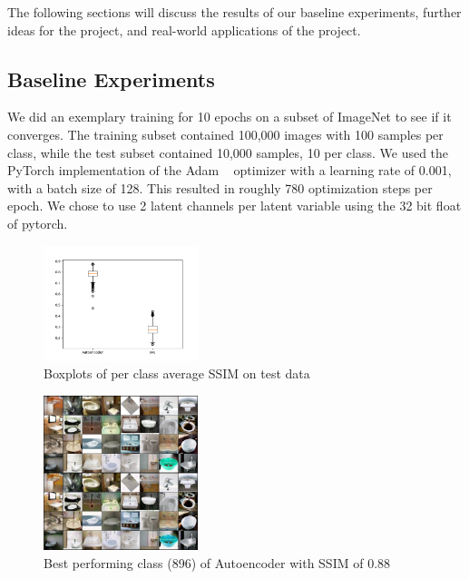 The following sections will discuss the results of our baseline experiments, further ideas for the project, and real-world applications of the project.

\subsection{Baseline Experiments}\label{subsec:baseline-results}
We did an exemplary training for 10 epochs on a subset of ImageNet to see if it converges.
The training subset contained 100,000 images with 100 samples per class, while the test subset contained 10,000 samples, 10 per class.
We used the PyTorch implementation of the Adam ~\cite{citationNeeded} optimizer with a learning rate of 0.001,
with a batch size of 128.
This resulted in roughly 780 optimization steps per epoch.
We chose to use 2 latent channels per latent variable using the 32 bit float of pytorch.

\begin{figure}
    \centering
    \includegraphics[width=0.4\textwidth]{../../sample_images/evaluation/boxplot_ae_and_vae}
    \caption{Boxplots of per class average SSIM on test data}
    \label{fig:boxplots}
\end{figure}

\begin{figure}
    \centering
    \includegraphics[width=0.4\textwidth]{../../sample_images/evaluation/MAX_AE_IDX_896}
    \caption{Best performing class (896) of Autoencoder with SSIM of 0.88}
    \label{fig:imnet_best_perf_ae}
\end{figure}

